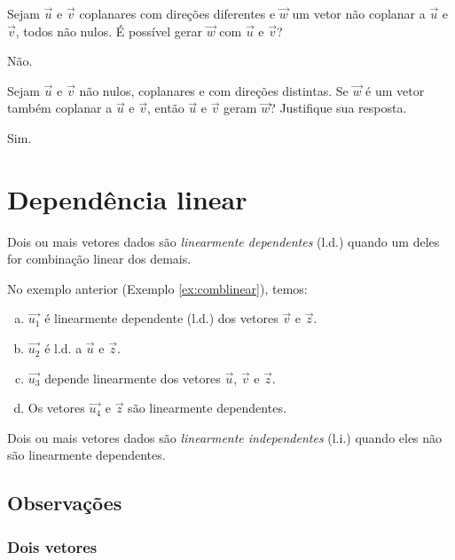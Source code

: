 \begin{exer}
  Sejam $\vec{u}$ e $\vec{v}$ coplanares com direções diferentes e $\vec{w}$ um vetor não coplanar a $\vec{u}$ e $\vec{v}$, todos não nulos. É possível gerar $\vec{w}$ com $\vec{u}$ e $\vec{v}$?
\end{exer}
\begin{resp}
  Não.
\end{resp}

\begin{exer}
  Sejam $\vec{u}$ e $\vec{v}$ não nulos, coplanares e com direções distintas. Se $\vec{w}$ é um vetor também coplanar a $\vec{u}$ e $\vec{v}$, então $\vec{u}$ e $\vec{v}$ geram $\vec{w}$? Justifique sua resposta.
\end{exer}
\begin{resp}
  Sim.
\end{resp}

\section{Dependência linear}\label{cap_base_sec_deplinear}

Dois ou mais vetores dados são \emph{linearmente dependentes} (l.d.) quando um deles for combinação linear dos demais.

\begin{ex}\label{ex:deplinear}
  No exemplo anterior (Exemplo \ref{ex:comblinear}), temos:
  \begin{enumerate}[a)]
  \item $\vec{u_1}$ é linearmente dependente (l.d.) dos vetores $\vec{v}$ e $\vec{z}$.
  \item $\vec{u_2}$ é l.d. a $\vec{u}$ e $\vec{z}$.
  \item $\vec{u_3}$ depende linearmente dos vetores $\vec{u}$, $\vec{v}$ e $\vec{z}$.
  \item Os vetores $\vec{u_4}$ e $\vec{z}$ são linearmente dependentes.
  \end{enumerate}
\end{ex}

Dois ou mais vetores dados são \emph{linearmente independentes} (l.i.) quando eles não são linearmente dependentes.

\subsection{Observações}\label{cap_base_sec_deplin_subsec_obs}

\subsubsection{Dois vetores}

